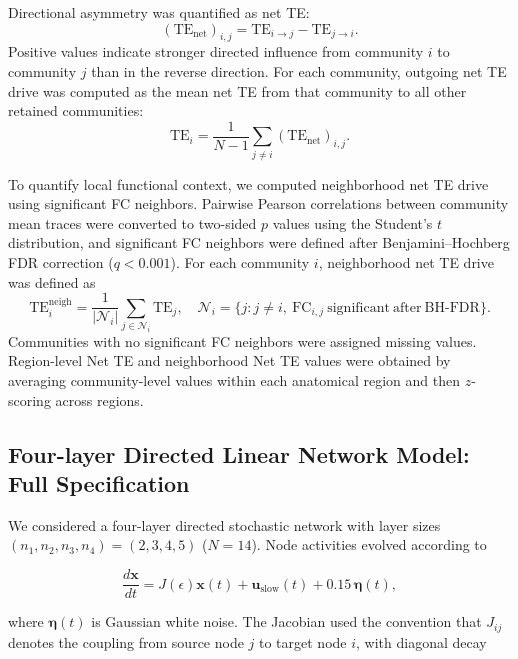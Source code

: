 \documentclass[9pt,twoside]{pnas-new}
\begin{document}
Directional asymmetry was quantified as net TE:
\begin{equation}
(\mathrm{TE}_{\mathrm{net}})_{i,j}
=
\mathrm{TE}_{i\rightarrow j}
-
\mathrm{TE}_{j\rightarrow i}.
\end{equation}
Positive values indicate stronger directed influence from community $i$ to community $j$ than in the reverse direction. For each community, outgoing net TE drive was computed as the mean net TE from that community to all other retained communities:
\begin{equation}
\mathrm{TE}_i =
\frac{1}{N-1}
\sum_{j\neq i}
(\mathrm{TE}_{\mathrm{net}})_{i,j}.
\end{equation}

To quantify local functional context, we computed neighborhood net TE drive using significant FC neighbors. Pairwise Pearson correlations between community mean traces were converted to two-sided $p$ values using the Student's $t$ distribution, and significant FC neighbors were defined after Benjamini--Hochberg FDR correction ($q<0.001$). For each community $i$, neighborhood net TE drive was defined as
\begin{equation}
\mathrm{TE}_i^{\mathrm{neigh}}
=
\frac{1}{|\mathcal{N}_i|}
\sum_{j\in\mathcal{N}_i}
\mathrm{TE}_j,
\quad
\mathcal{N}_i =
\{j:j\neq i,\ \mathrm{FC}_{i,j}\ \mathrm{significant\ after\ BH\text{-}FDR}\}.
\end{equation}
Communities with no significant FC neighbors were assigned missing values. Region-level Net TE and neighborhood Net TE values were obtained by averaging community-level values within each anatomical region and then $z$-scoring across regions.


\subsection*{Four-layer Directed Linear Network Model: Full Specification}

We considered a four-layer directed stochastic network with layer sizes
$(n_1,n_2,n_3,n_4)=(2,3,4,5)$ ($N=14$). Node activities evolved according to

\[
\frac{d\mathbf{x}}{dt}
=
J(\epsilon)\mathbf{x}(t)
+
\mathbf{u}_{\mathrm{slow}}(t)
+
0.15\,\boldsymbol{\eta}(t),
\]

where $\boldsymbol{\eta}(t)$ is Gaussian white noise. The Jacobian used the
convention that $J_{ij}$ denotes the coupling from source node $j$ to target
node $i$, with diagonal decay
\end{document}
